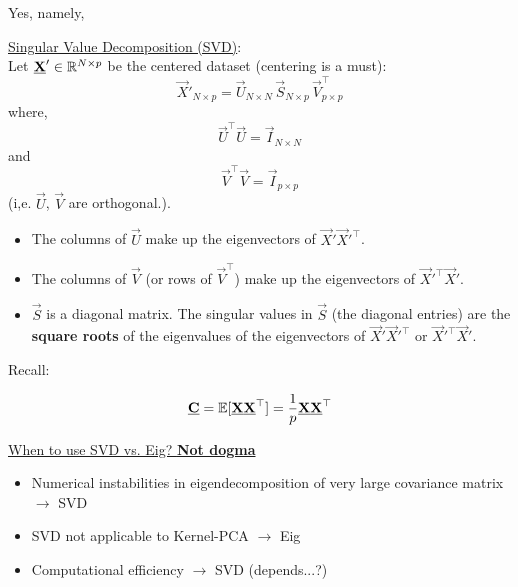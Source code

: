
Yes, namely,

\underline{Singular Value Decomposition (SVD)}:\\
Let $\underline{\mathbf{X}}' \in \mathbb{R}^{N \times p}$ be the centered dataset (centering is a must):
$$
\vec X'_{N \times p} = \vec U_{N \times N} \, \vec S_{N \times p} \, \vec V^\top_{{p \times p}}
$$
where,
$$
\vec U^\top \vec U = \vec I_{N \times N}
$$ and 
$$
\vec V^\top \vec V = \vec I_{p \times p}
$$ (i,e. $\vec U$, $\vec V$ are orthogonal.).
\begin{itemize}
\renewcommand\labelitemi{--}
\item The columns of $\vec U$ make up the eigenvectors of $\vec X'\vec X'^\top$.
\item The columns of $\vec V$ (or rows of $\vec V^\top$) make up the eigenvectors of $\vec X'^\top\vec X'$.
\item $\vec S$ is a diagonal matrix. The singular values in $\vec S$ (the diagonal entries) are the \textbf{square roots} of the  eigenvalues of the eigenvectors of $\vec X'\vec X'^\top$ or $\vec X'^\top\vec X'$.

\end{itemize}
Recall:

$$
\underline{\mathbf{C}} = \mathbb{E}[\underline{\mathbf{X}} \underline{\mathbf{X}}^\top] = \frac{1}{p} \underline{\mathbf{X}} \underline{\mathbf{X}}^\top
$$

\underline{When to use SVD vs. Eig? \textbf{Not dogma}}

\begin{itemize}

\item Numerical instabilities in eigendecomposition of very large covariance matrix $\rightarrow$ SVD
\item SVD not applicable to Kernel-PCA $\rightarrow$ Eig
\item Computational efficiency $\rightarrow$ SVD (depends...?)
\end{itemize}
